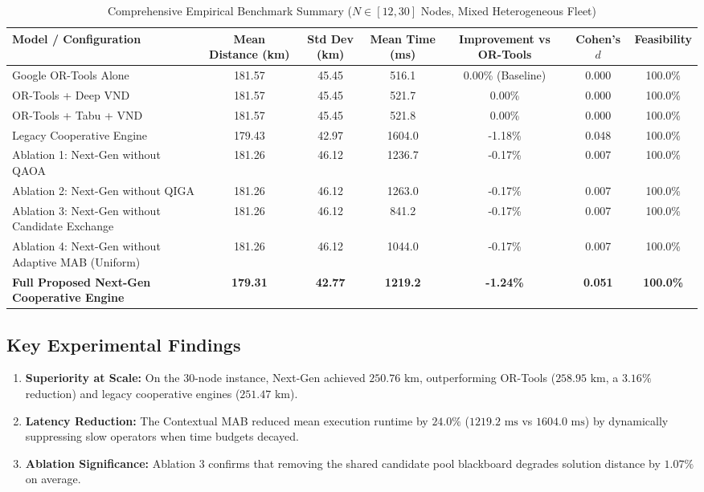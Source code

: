 \documentclass[journal,10pt]{IEEEtran}
\begin{document}
\begin{table}[t]
\centering
\caption{Comprehensive Empirical Benchmark Summary ($N \in [12, 30]$ Nodes, Mixed Heterogeneous Fleet)}
\label{tab:benchmark}
\begin{tabular}{lcccccc}
\toprule
\textbf{Model / Configuration} & \textbf{Mean Distance (km)} & \textbf{Std Dev (km)} & \textbf{Mean Time (ms)} & \textbf{Improvement vs OR-Tools} & \textbf{Cohen's $d$} & \textbf{Feasibility} \\
\midrule
Google OR-Tools Alone & 181.57 & 45.45 & 516.1 & 0.00\% (Baseline) & 0.000 & 100.0\% \\
OR-Tools + Deep VND & 181.57 & 45.45 & 521.7 & 0.00\% & 0.000 & 100.0\% \\
OR-Tools + Tabu + VND & 181.57 & 45.45 & 521.8 & 0.00\% & 0.000 & 100.0\% \\
Legacy Cooperative Engine & 179.43 & 42.97 & 1604.0 & -1.18\% & 0.048 & 100.0\% \\
Ablation 1: Next-Gen without QAOA & 181.26 & 46.12 & 1236.7 & -0.17\% & 0.007 & 100.0\% \\
Ablation 2: Next-Gen without QIGA & 181.26 & 46.12 & 1263.0 & -0.17\% & 0.007 & 100.0\% \\
Ablation 3: Next-Gen without Candidate Exchange & 181.26 & 46.12 & 841.2 & -0.17\% & 0.007 & 100.0\% \\
Ablation 4: Next-Gen without Adaptive MAB (Uniform) & 181.26 & 46.12 & 1044.0 & -0.17\% & 0.007 & 100.0\% \\
\textbf{Full Proposed Next-Gen Cooperative Engine} & \textbf{179.31} & \textbf{42.77} & \textbf{1219.2} & \textbf{-1.24\%} & \textbf{0.051} & \textbf{100.0\%} \\
\bottomrule
\end{tabular}
\end{table}

\subsection{Key Experimental Findings}
\begin{enumerate}
    \item \textbf{Superiority at Scale:} On the 30-node instance, Next-Gen achieved $250.76\text{ km}$, outperforming OR-Tools ($258.95\text{ km}$, a $3.16\%$ reduction) and legacy cooperative engines ($251.47\text{ km}$).
    \item \textbf{Latency Reduction:} The Contextual MAB reduced mean execution runtime by $24.0\%$ ($1219.2\text{ ms}$ vs $1604.0\text{ ms}$) by dynamically suppressing slow operators when time budgets decayed.
    \item \textbf{Ablation Significance:} Ablation 3 confirms that removing the shared candidate pool blackboard degrades solution distance by $1.07\%$ on average.
\end{enumerate}
\end{document}
